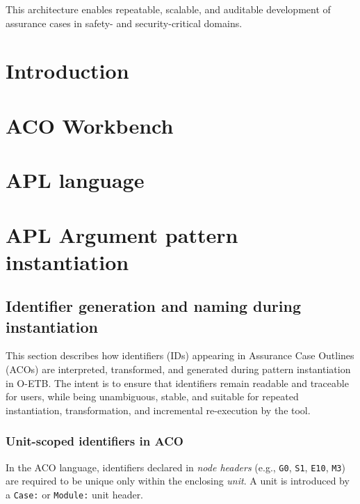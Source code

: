 \documentclass[12pt,twoside,a4paper]{article}
\begin{document}
This architecture enables repeatable, scalable, and auditable development of assurance cases in safety- and security-critical domains.

\clearpage
{}
\setcounter{page}{1}

\section{Introduction}

\section{ACO Workbench}

\section{APL language}


\section{APL Argument pattern instantiation}
\subsection{Identifier generation and naming during instantiation}
\label{sec:aco-id-generation}

This section describes how identifiers (IDs) appearing in Assurance Case Outlines (ACOs) are interpreted, transformed, and generated during pattern instantiation in O-ETB. The intent is to ensure that identifiers remain readable and traceable for users, while being unambiguous, stable, and suitable for repeated instantiation, transformation, and incremental re-execution by the tool.

\subsubsection{Unit-scoped identifiers in ACO}
\label{sec:aco-unit-scope}

In the ACO language, identifiers declared in \emph{node headers} (e.g., \texttt{G0}, \texttt{S1}, \texttt{E10}, \texttt{M3}) are required to be unique only within the enclosing \emph{unit}. A unit is introduced by a \texttt{Case:} or \texttt{Module:} unit header.
\end{document}
